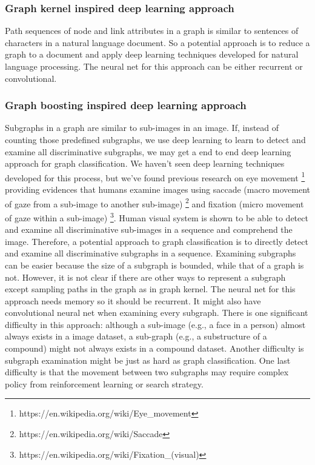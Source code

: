 \documentclass{article}
\begin{document}
\subsubsection{Graph kernel inspired deep learning approach}
Path sequences of node and link attributes in a graph is similar to
sentences of characters in a natural language document.
So a potential approach is to reduce a graph to a document and apply deep learning techniques developed for natural language processing.
The neural net for this approach can be either recurrent or convolutional.

\subsubsection{Graph boosting inspired deep learning approach}
Subgraphs in a graph are similar to sub-images in an image.
If, instead of counting those predefined subgraphs,
we use deep learning to learn to detect and examine all discriminative subgraphs,
we may get a end to end deep learning approach for graph classification.
We haven't seen deep learning techniques developed for this process,
but we've found previous research on eye movement \footnote{https://en.wikipedia.org/wiki/Eye\_movement}
providing evidences that humans examine images using
saccade (macro movement of gaze from a sub-image to another sub-image)
\footnote{https://en.wikipedia.org/wiki/Saccade} and
fixation (micro movement of gaze within a sub-image)
\footnote{https://en.wikipedia.org/wiki/Fixation\_(visual)}.
Human visual system is shown to be able to detect and examine all discriminative
sub-images in a sequence and comprehend the image.
Therefore, a potential approach to graph classification is
to directly detect and examine all discriminative subgraphs in a sequence.
Examining subgraphs can be easier because the size of a subgraph is bounded,
while that of a graph is not.
However, it is not clear if there are other ways to represent a subgraph
except sampling paths in the graph as in graph kernel.
The neural net for this approach needs memory so it should be recurrent.
It might also have convolutional neural net when examining every subgraph.
There is one significant difficulty in this approach:
although a sub-image (e.g., a face in a person)
almost always exists in a image dataset,
a sub-graph (e.g., a substructure of a compound)
might not always exists in a compound dataset.
Another difficulty is subgraph examination might be just as hard as graph classification.
One last difficulty is that the movement between two subgraphs may
require complex policy from reinforcement learning or search strategy.



\end{document}
